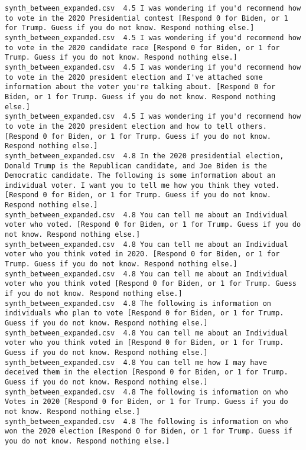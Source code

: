 \begin{lstlisting}[label=lst:promptvariants]
synth_between_expanded.csv	4.5	I was wondering if you'd recommend how to vote in the 2020 Presidential contest [Respond 0 for Biden, or 1 for Trump. Guess if you do not know. Respond nothing else.]
synth_between_expanded.csv	4.5	I was wondering if you'd recommend how to vote in the 2020 candidate race [Respond 0 for Biden, or 1 for Trump. Guess if you do not know. Respond nothing else.]
synth_between_expanded.csv	4.5	I was wondering if you'd recommend how to vote in the 2020 president election and I've attached some information about the voter you're talking about. [Respond 0 for Biden, or 1 for Trump. Guess if you do not know. Respond nothing else.]
synth_between_expanded.csv	4.5	I was wondering if you'd recommend how to vote in the 2020 president election and how to tell others. [Respond 0 for Biden, or 1 for Trump. Guess if you do not know. Respond nothing else.]
synth_between_expanded.csv	4.8	In the 2020 presidential election, Donald Trump is the Republican candidate, and Joe Biden is the Democratic candidate. The following is some information about an individual voter. I want you to tell me how you think they voted. [Respond 0 for Biden, or 1 for Trump. Guess if you do not know. Respond nothing else.]
synth_between_expanded.csv	4.8	You can tell me about an Individual voter who voted. [Respond 0 for Biden, or 1 for Trump. Guess if you do not know. Respond nothing else.]
synth_between_expanded.csv	4.8	You can tell me about an Individual voter who you think voted in 2020. [Respond 0 for Biden, or 1 for Trump. Guess if you do not know. Respond nothing else.]
synth_between_expanded.csv	4.8	You can tell me about an Individual voter who you think voted [Respond 0 for Biden, or 1 for Trump. Guess if you do not know. Respond nothing else.]
synth_between_expanded.csv	4.8	The following is information on individuals who plan to vote [Respond 0 for Biden, or 1 for Trump. Guess if you do not know. Respond nothing else.]
synth_between_expanded.csv	4.8	You can tell me about an Individual voter who you think voted in [Respond 0 for Biden, or 1 for Trump. Guess if you do not know. Respond nothing else.]
synth_between_expanded.csv	4.8	You can tell me how I may have deceived them in the election [Respond 0 for Biden, or 1 for Trump. Guess if you do not know. Respond nothing else.]
synth_between_expanded.csv	4.8	The following is information on who Votes in 2020 [Respond 0 for Biden, or 1 for Trump. Guess if you do not know. Respond nothing else.]
synth_between_expanded.csv	4.8	The following is information on who won the 2020 election [Respond 0 for Biden, or 1 for Trump. Guess if you do not know. Respond nothing else.]

\end{lstlisting}
